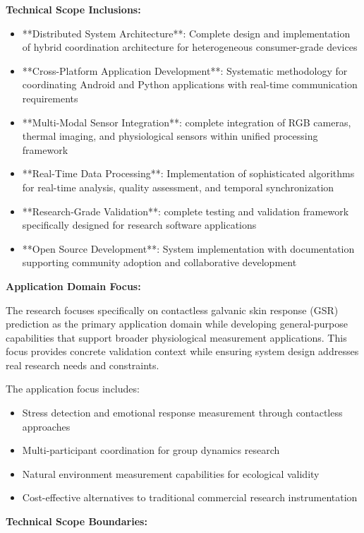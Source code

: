 \documentclass[11pt,a4paper]{article}
\begin{document}
\textbf{Technical Scope Inclusions:}

\begin{itemize}
\item **Distributed System Architecture**: Complete design and implementation of hybrid coordination architecture for
  heterogeneous consumer-grade devices
\item **Cross-Platform Application Development**: Systematic methodology for coordinating Android and Python applications
  with real-time communication requirements
\item **Multi-Modal Sensor Integration**: complete integration of RGB cameras, thermal imaging, and physiological
  sensors within unified processing framework
\item **Real-Time Data Processing**: Implementation of sophisticated algorithms for real-time analysis, quality assessment,
  and temporal synchronization
\item **Research-Grade Validation**: complete testing and validation framework specifically designed for research
  software applications
\item **Open Source Development**: System implementation with documentation supporting community
  adoption and collaborative development

\end{itemize}
\textbf{Application Domain Focus:}

The research focuses specifically on contactless galvanic skin response (GSR)
prediction as the primary application
domain while developing general-purpose capabilities that support broader
physiological measurement applications.  This
focus provides concrete validation context while ensuring system design addresses
real research needs and constraints.

The application focus includes:

\begin{itemize}
\item Stress detection and emotional response measurement through contactless approaches
\item Multi-participant coordination for group dynamics research
\item Natural environment measurement capabilities for ecological validity
\item Cost-effective alternatives to traditional commercial research instrumentation

\end{itemize}
\textbf{Technical Scope Boundaries:}
\end{document}
